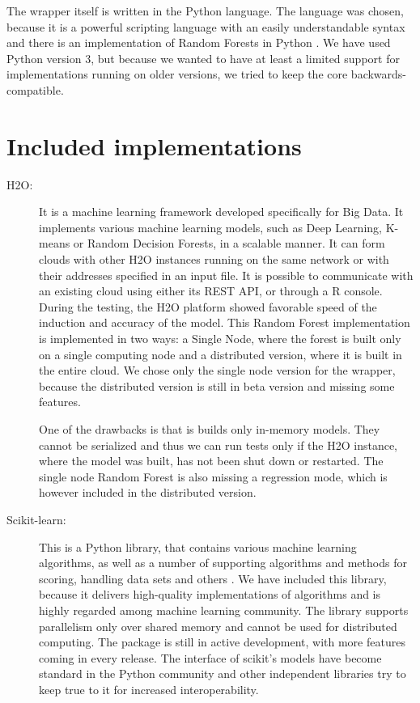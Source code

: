 \documentclass[thesis=B,english]{FITthesis}[2012/10/20]
\begin{document}
The wrapper itself is written in the Python language. The language was chosen, because it is a powerful scripting language with an easily understandable syntax and there is an implementation of Random Forests in Python \cite{scikit-learn}. We have used Python version 3, but because we wanted to have at least a limited support for implementations running on older versions, we tried to keep the core backwards-compatible.

\section{Included implementations}
\begin{description}
\item[H2O:] It is a machine learning framework developed specifically for Big Data. It implements various machine learning models, such as Deep Learning, K-means or Random Decision Forests, in a scalable manner. It can form clouds with other H2O instances running on the same network or with their addresses specified in an input file. It is possible to communicate with an existing cloud using either its REST API, or through a R console. During the testing, the H2O platform showed favorable speed of the induction and accuracy of the model. This Random Forest implementation is implemented in two ways: a Single Node, where the forest is built only on a single computing node and a distributed version, where it is built in the entire cloud. We chose only the single node version for the wrapper, because the distributed version is still in beta version and missing some features.

One of the drawbacks is that is builds only in-memory models. They cannot be serialized and thus we can run tests only if the H2O instance, where the model was built, has not been shut down or restarted. The single node Random Forest is also missing a regression mode, which is however included in the distributed version.
\item[Scikit-learn:] This is a Python library, that contains various machine learning algorithms, as well as a number of supporting algorithms and methods for scoring, handling data sets and others \cite{scikit-learn}. We have included this library, because it delivers high-quality implementations of algorithms and is highly regarded among machine learning community. The library supports parallelism only over shared memory and cannot be used for distributed computing. The package is still in active development, with more features coming in every release. The interface of scikit's models have become standard in the Python community and other independent libraries try to keep true to it for increased interoperability.


\end{description}
\end{document}
